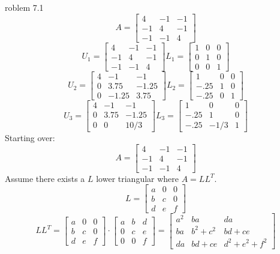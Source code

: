 \documentclass[12pt]{article}
\makeatletter
\theoremstyle{homework}
\newenvironment{exercise}[1]
{\def\@currentlabel{#1}\exercisecore}
{\endexercisecore}
\makeatother
\begin{document}
\begin{exercise}

Problem 7.1
\end{exercise}
$$A=\begin{bmatrix}
4 & -1 & -1\\
-1 & 4 & -1\\
-1 & -1 & 4
\end{bmatrix}$$
$$U_1=\begin{bmatrix}
4 & -1 & -1\\
-1 & 4 & -1\\
-1 & -1 & 4
\end{bmatrix}
L_1=\begin{bmatrix}
1 & 0 & 0\\
0 & 1 & 0\\
0 & 0 & 1
\end{bmatrix}$$
$$U_2=\begin{bmatrix}
4 & -1 & -1\\
0 & 3.75 & -1.25\\
0 & -1.25 & 3.75
\end{bmatrix}
L_2=\begin{bmatrix}
1 & 0 & 0\\
-.25 & 1 & 0\\
-.25 & 0 & 1
\end{bmatrix}$$
$$U_3=\begin{bmatrix}
4 & -1 & -1\\
0 & 3.75 & -1.25\\
0 & 0 & 10/3
\end{bmatrix}
L_3=\begin{bmatrix}
1 & 0 & 0\\
-.25 & 1 & 0\\
-.25 & -1/3 & 1
\end{bmatrix}$$
Starting over:
$$A=\begin{bmatrix}
4 & -1 & -1\\
-1 & 4 & -1\\
-1 & -1 & 4
\end{bmatrix}$$
Assume there exists a $L$ lower triangular where $A=LL^T$.
$$L=\begin{bmatrix}
a & 0 & 0\\
b & c & 0\\
d & e & f
\end{bmatrix}$$
$$LL^T=\begin{bmatrix}
a & 0 & 0\\
b & c & 0\\
d & e & f
\end{bmatrix}
\cdot
\begin{bmatrix}
a & b & d\\
0 & c & e\\
0 & 0 & f
\end{bmatrix}=\begin{bmatrix}
a^2 & ba & da\\
ba & b^2+c^2 & bd+ce\\
da & bd+ce & d^2+e^2+f^2
\end{bmatrix}$$
\end{document}
